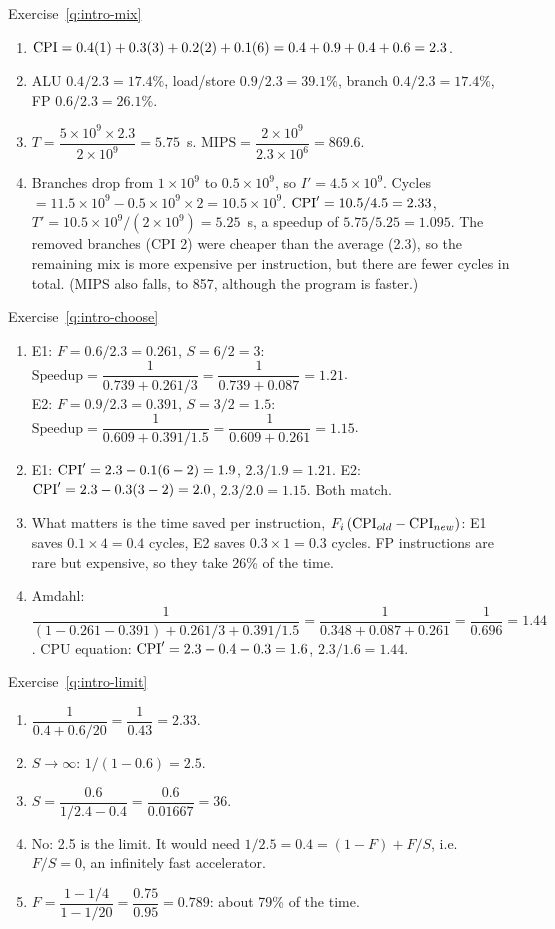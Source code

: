 \begin{noot}{Exercise~\ref{q:intro-mix}}
\begin{enumerate}[label=(\alph*),leftmargin=*]
  \item $\mathrm{CPI}=0.4(1)+0.3(3)+0.2(2)+0.1(6)=0.4+0.9+0.4+0.6=2.3$.
  \item ALU $0.4/2.3=17.4\%$, load/store $0.9/2.3=39.1\%$, branch
  $0.4/2.3=17.4\%$, FP $0.6/2.3=26.1\%$.
  \item $T=\dfrac{5\times10^9\times2.3}{2\times10^9}=5.75$~s.
  $\text{MIPS}=\dfrac{2\times10^9}{2.3\times10^6}=869.6$.
  \item Branches drop from $1\times10^9$ to $0.5\times10^9$, so
  $I'=4.5\times10^9$. Cycles $=11.5\times10^9-0.5\times10^9\times2=10.5\times10^9$.
  $\mathrm{CPI}'=10.5/4.5=2.33$, $T'=10.5\times10^9/(2\times10^9)=5.25$~s, a speedup of
  $5.75/5.25=1.095$. The removed branches (CPI 2) were cheaper than the average
  (2.3), so the remaining mix is more expensive per instruction, but there are
  fewer cycles in total. (MIPS also falls, to 857, although the program is
  faster.)
\end{enumerate}
\end{noot}

\begin{noot}{Exercise~\ref{q:intro-choose}}
\begin{enumerate}[label=(\alph*),leftmargin=*]
  \item E1: $F=0.6/2.3=0.261$, $S=6/2=3$:
  $\text{Speedup}=\dfrac{1}{0.739+0.261/3}=\dfrac{1}{0.739+0.087}=1.21$.\\
  E2: $F=0.9/2.3=0.391$, $S=3/2=1.5$:
  $\text{Speedup}=\dfrac{1}{0.609+0.391/1.5}=\dfrac{1}{0.609+0.261}=1.15$.
  \item E1: $\mathrm{CPI}'=2.3-0.1(6-2)=1.9$, $2.3/1.9=1.21$.
  E2: $\mathrm{CPI}'=2.3-0.3(3-2)=2.0$, $2.3/2.0=1.15$. Both match.
  \item What matters is the time saved per instruction,
  $F_i\,(\mathrm{CPI}_{old}-\mathrm{CPI}_{new})$: E1 saves $0.1\times4=0.4$ cycles, E2 saves
  $0.3\times1=0.3$ cycles. FP instructions are rare but expensive, so they take
  26\% of the time.
  \item Amdahl: $\dfrac{1}{(1-0.261-0.391)+0.261/3+0.391/1.5}
  =\dfrac{1}{0.348+0.087+0.261}=\dfrac{1}{0.696}=1.44$.
  CPU equation: $\mathrm{CPI}'=2.3-0.4-0.3=1.6$, $2.3/1.6=1.44$.
\end{enumerate}
\end{noot}

\begin{noot}{Exercise~\ref{q:intro-limit}}
\begin{enumerate}[label=(\alph*),leftmargin=*]
  \item $\dfrac{1}{0.4+0.6/20}=\dfrac{1}{0.43}=2.33$.
  \item $S\to\infty$: $1/(1-0.6)=2.5$.
  \item $S=\dfrac{0.6}{1/2.4-0.4}=\dfrac{0.6}{0.01667}=36$.
  \item No: 2.5 is the limit. It would need $1/2.5=0.4=(1-F)+F/S$, i.e.\
  $F/S=0$, an infinitely fast accelerator.
  \item $F=\dfrac{1-1/4}{1-1/20}=\dfrac{0.75}{0.95}=0.789$: about 79\% of the time.
\end{enumerate}
\end{noot}

